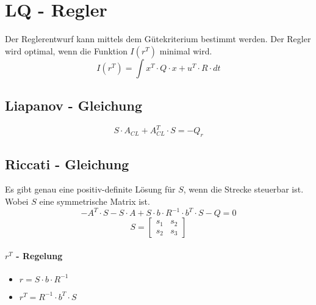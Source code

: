 



\section{LQ - Regler}
Der Reglerentwurf kann mittels dem Gütekriterium bestimmt werden. Der Regler wird optimal, wenn die Funktion $ I(r^T) $ minimal wird.
\[
	I(r^T)=\int {x^T\cdot Q\cdot x+u^T\cdot R \cdot dt}
\]
\subsection{Liapanov - Gleichung}
\[
	S\cdot A_{CL} + A^T_{CL}\cdot S = -Q_r
\]
\subsection{Riccati - Gleichung}
Es gibt genau eine positiv-definite Lösung für $ S $, wenn die Strecke steuerbar ist. Wobei $ S $ eine symmetrische Matrix ist.
\[
	-A^T\cdot S-S\cdot A+S\cdot b\cdot R^{-1} \cdot b^T \cdot S-Q=0	
\]
\[
	S=
	\begin{bmatrix}
	s_1 & s_2  \\ 
	s_2 & s_3
	\end{bmatrix} 
\]
\paragraph{$ r^T $ - Regelung}	
	\begin{itemize}
		\item $ r=S\cdot b\cdot R^{-1} $
		\item $ r^T=R^{-1}\cdot b^T\cdot S $
	\end{itemize}


